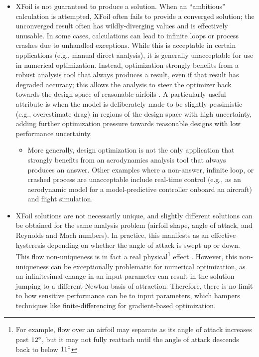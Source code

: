 \documentclass[journal]{new-aiaa}
\begin{document}
\begin{itemize}
    \item XFoil is not guaranteed to produce a solution. When an ``ambitious'' calculation is attempted, XFoil often fails to provide a converged solution; the unconverged result often has wildly-diverging values and is effectively unusable. In some cases, calculations can lead to infinite loops or process crashes due to unhandled exceptions. While this is acceptable in certain applications (e.g., manual direct analysis), it is generally unacceptable for use in numerical optimization. Instead, optimization strongly benefits from a robust analysis tool that always produces a result, even if that result has degraded accuracy; this allows the analysis to steer the optimizer back towards the design space of reasonable airfoils \cite{he2019robust}. A particularly useful attribute is when the model is deliberately made to be slightly pessimistic (e.g., overestimate drag) in regions of the design space with high uncertainty, adding further optimization pressure towards reasonable designs with low performance uncertainty.
          \begin{itemize}
              \item More generally, design optimization is not the only application that strongly benefits from an aerodynamics analysis tool that always produces an answer. Other examples where a non-answer, infinite loop, or crashed process are unacceptable include real-time control (e.g., as an aerodynamic model for a model-predictive controller onboard an aircraft) and flight simulation.
          \end{itemize}
    \item XFoil solutions are not necessarily unique, and slightly different solutions can be obtained for the same analysis problem (airfoil shape, angle of attack, and Reynolds and Mach numbers). In practice, this manifests as an effective hysteresis depending on whether the angle of attack is swept up or down. This flow non-uniqueness is in fact a real physical\footnote{For example, flow over an airfoil may separate as its angle of attack increases past $12\degree$, but it may not fully reattach until the angle of attack descends back to below $11\degree$} effect \cite{jamesonAirfoilsAdmittingNonunique1991,kuzmin2012non,he2019robust}. However, this non-uniqueness can be exceptionally problematic for numerical optimization, as an infinitesimal change in an input parameter can result in the solution jumping to a different Newton basis of attraction. Therefore, there is no limit to how sensitive performance can be to input parameters, which hampers techniques like finite-differencing for gradient-based optimization.

\end{itemize}
\end{document}
